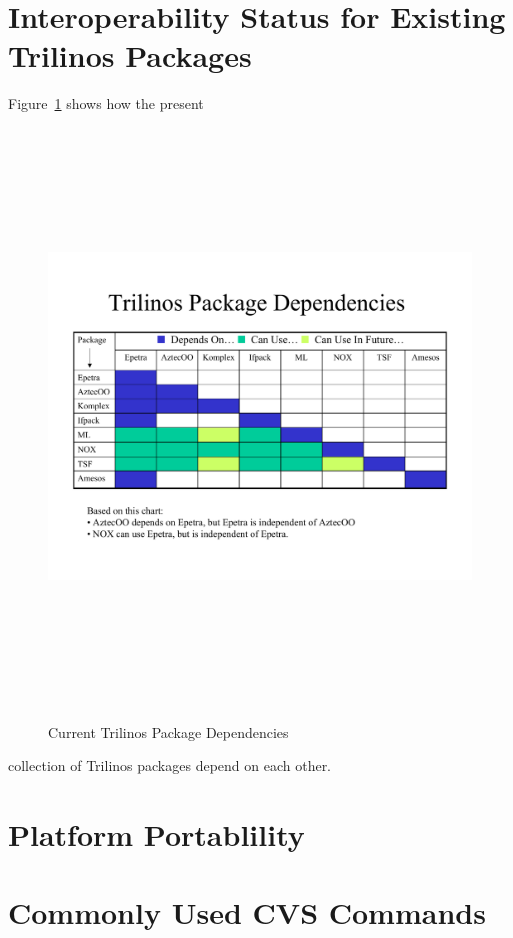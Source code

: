 \documentclass[12pt,relax]{TrilinosDevGuide}
\begin{document}
\section{Interoperability Status for Existing Trilinos Packages}
Figure~\ref{Figure:TrilinosPackageDependencies} shows how the present
\begin{figure}
\includegraphics[height=6in,angle=270]{TrilinosPackageDependencies}
\label{Figure:TrilinosPackageDependencies}
\caption{Current Trilinos Package Dependencies}
\end{figure}
collection of Trilinos packages depend on each other.

\section{Platform Portablility}

\clearpage



\appendix
\section{Commonly Used CVS Commands}
\label{Section:CVS}
\end{document}
